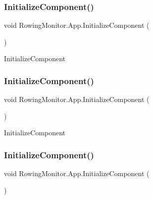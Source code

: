 \subsubsection{\texorpdfstring{Initialize\+Component()}{InitializeComponent()}\hspace{0.1cm}{\footnotesize\ttfamily [1/4]}}
{\footnotesize\ttfamily void Rowing\+Monitor.\+App.\+Initialize\+Component (\begin{DoxyParamCaption}{ }\end{DoxyParamCaption})}



Initialize\+Component 

\mbox{\label{class_rowing_monitor_1_1_app_a92cbce86d55626b5b411b795ec66c0c2}} 
\subsubsection{\texorpdfstring{Initialize\+Component()}{InitializeComponent()}\hspace{0.1cm}{\footnotesize\ttfamily [2/4]}}
{\footnotesize\ttfamily void Rowing\+Monitor.\+App.\+Initialize\+Component (\begin{DoxyParamCaption}{ }\end{DoxyParamCaption})}



Initialize\+Component 

\mbox{\label{class_rowing_monitor_1_1_app_a92cbce86d55626b5b411b795ec66c0c2}} 
\subsubsection{\texorpdfstring{Initialize\+Component()}{InitializeComponent()}\hspace{0.1cm}{\footnotesize\ttfamily [3/4]}}
{\footnotesize\ttfamily void Rowing\+Monitor.\+App.\+Initialize\+Component (\begin{DoxyParamCaption}{ }\end{DoxyParamCaption})}



